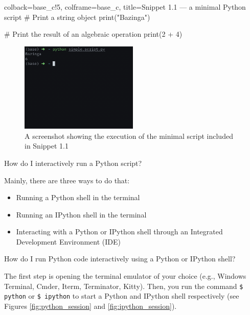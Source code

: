 \documentclass[a4paper,11pt]{book}
\newcommand{\question}[1]{%
    \begin{tcolorbox}[colback=comp_c!10,colframe=comp_c,sidebyside align=top,width=\linewidth,before skip=1ex]
        #1
    \end{tcolorbox}
    \switchcolumn%
}
\newcommand{\note}[1]{%
    \begin{tcolorbox}[colback=white!0,colframe=white!10,width=\linewidth,before skip=1ex]
        #1
    \end{tcolorbox}
}
\begin{document}
\begin{pythoncode}[linenos=True]{colback=base_c!5, colframe=base_c, title=\sffamily Snippet 1.1 --- a minimal Python script}
# Print a string object
print("Bazinga")

# Print the result of an algebraic operation
print(2 + 4)
\end{pythoncode}

\begin{figure}[!htbp]
	\begin{center}
		\includegraphics[width=0.5\textwidth]{simple_script}
	\end{center}
	\caption{A screenshot showing the execution of the minimal script included in Snippet 1.1}
	\label{fig:simple_script}
\end{figure}

\begin{paracol}{2}
	\question{\raggedright How do I interactively run a Python script?}
	\note{Mainly, there are three ways to do that:
	\begin{itemize}
		\item Running a Python shell in the terminal
		\item Running an IPython shell in the terminal
		\item Interacting with a Python or IPython shell through an Integrated Development Environment (IDE)
	\end{itemize}
	}
\end{paracol}

\begin{paracol}{2}
	\question{\raggedright How do I run Python code interactively using a Python or IPython shell?}
	\note{The first step is opening the terminal emulator of your choice (e.g., Windows Terminal, Cmder, Iterm, Terminator, Kitty). Then, you run the command \texttt{\$ python} or \texttt{\$ ipython} to start a Python and IPython shell respectively (see Figures \ref{fig:python_session} and \ref{fig:ipython_session}).
	}
\end{paracol}
\end{document}
